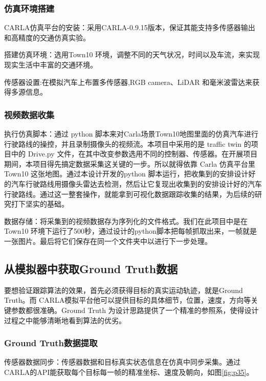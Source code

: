 \subsubsection{仿真环境搭建}

CARLA仿真平台的安装：采用CARLA-0.9.15版本，保证其能支持多传感器输出和高精度的交通仿真实验。

搭建仿真环境：选用Town10 环境，调整不同的天气状况，时间以及车流，来实现现实生活中丰富的交通环境。

传感器设置:在模拟汽车上布置多传感器,RGB  camera、LiDAR 和毫米波雷达来获得多源信息。

\subsubsection{视频数据收集}

执行仿真脚本：通过 python 脚本来对Carla场景Town10地图里面的仿真汽车进行行驶路线的操控，并且录制摄像头的视频流。本项目中采用的是 traffic twin 的项目中的 Drive.py 文件，在其中改变参数选用不同的控制器、传感器。在开展项目期间，本项目得先搞定数据采集这关键的一步。所以就得依靠 Carla 仿真平台里 Town10 这张地图。通过本设计开发的python 脚本运行，把收集到的安排设计好的汽车行驶路线用摄像头雷达去检测，然后让它复现出收集到的安排设计好的汽车行驶路线。通过这一整套操作，就能拿到可视化数据跟踪收集的结果，为后续的研究打下坚实的基础。

数据存储：将采集到的视频数据存为序列化的文件格式。我们在此项目中是在 Town10 环境下运行了500秒，通过设计的python脚本把每帧抓取出来，一帧就是一张图片。最后将它们保存在同一个文件夹中以进行下一步处理。



\subsection{从模拟器中获取Ground Truth数据}

要想验证跟踪算法的效果，首先必须获得目标的真实运动轨迹，就是Ground Truth。而 CARLA模拟平台他可以提供目标的具体细节，位置，速度，方向等关键参数都很准确。Ground Truth 为设计思路提供了一个精准的参照系，使得设计过程之中能够清晰地看到算法的优劣。


\subsubsection{Ground Truth数据提取}

传感器数据同步：传感器数据和目标真实状态信息在仿真中同步采集。通过CARLA的API能获取每个目标每一帧的精准坐标、速度及朝向，如图\ref{fig:p35}。

